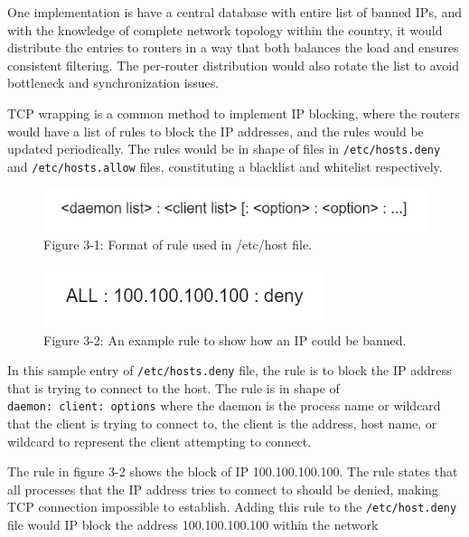 \documentclass[nonacm,sigplan,screen]{acmart}
\begin{document}
One implementation is have a central database with entire list of banned
IPs, and with the knowledge of complete network topology within the
country, it would distribute the entries to routers in a way that both
balances the load and ensures consistent filtering. The per-router
distribution would also rotate the list to avoid bottleneck and
synchronization issues.

TCP wrapping is a common method to implement IP blocking, where the
routers would have a list of rules to block the IP addresses, and the
rules would be updated periodically. The rules would be in shape of
files in \texttt{/etc/hosts.deny} and \texttt{/etc/hosts.allow} files,
constituting a blacklist and whitelist respectively.

\begin{figure}
\centering
\includegraphics[width=\columnwidth]{res/3.1-etc-host.jpg}
\caption{Figure 3-1: Format of rule used in /etc/host file.}
\end{figure}

\begin{figure}
\centering
\includegraphics[width=\columnwidth]{res/3.2-rule.png}
\caption{Figure 3-2: An example rule to show how an IP could be banned.}
\end{figure}

In this sample entry of \texttt{/etc/hosts.deny} file, the rule is to
block the IP address that is trying to connect to the host. The rule is
in shape of \texttt{daemon:\ client:\ options} where the daemon is the
process name or wildcard that the client is trying to connect to, the
client is the address, host name, or wildcard to represent the client
attempting to connect. \cite{12_hostman}

The rule in figure 3-2 shows the block of IP 100.100.100.100. The rule
states that all processes that the IP address tries to connect to should
be denied, making TCP connection impossible to establish. Adding this
rule to the \texttt{/etc/host.deny} file would IP block the address
100.100.100.100 within the network
\end{document}
